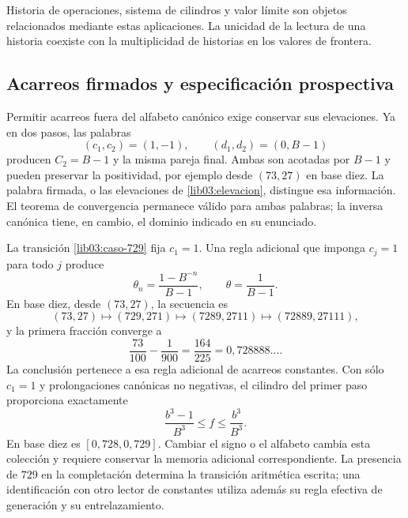 Historia de operaciones, sistema de cilindros y valor límite son
objetos relacionados mediante estas aplicaciones. La unicidad de la
lectura de una historia coexiste con la multiplicidad de historias en
los valores de frontera.

\subsection{Acarreos firmados y especificación prospectiva}
\label{lib03:firmados}

Permitir acarreos fuera del alfabeto canónico exige conservar sus
elevaciones. Ya en dos pasos, las palabras
\[
 (c_1,c_2)=(1,-1),\qquad(d_1,d_2)=(0,B-1)
\]
producen \(C_2=B-1\) y la misma pareja final. Ambas son acotadas por
\(B-1\) y pueden preservar la positividad, por ejemplo desde
\((73,27)\) en base diez. La palabra firmada, o las elevaciones de
\eqref{lib03:elevacion}, distingue esa información. El teorema de
convergencia permanece válido para ambas palabras; la inversa canónica
tiene, en cambio, el dominio indicado en su enunciado.

La transición \eqref{lib03:caso-729} fija \(c_1=1\). Una regla
adicional que imponga \(c_j=1\) para todo \(j\) produce
\begin{equation}
 \theta_n=\frac{1-B^{-n}}{B-1},\qquad
 \theta=\frac1{B-1}.
 \label{lib03:acarreo-constante}
\end{equation}
En base diez, desde \((73,27)\), la secuencia es
\[
 (73,27)\longmapsto(729,271)\longmapsto(7289,2711)
 \longmapsto(72889,27111),
\]
y la primera fracción converge a
\begin{equation}
 \frac{73}{100}-\frac1{900}=\frac{164}{225}
 =0{,}728888\ldots.
 \label{lib03:limite-constante}
\end{equation}
La conclusión pertenece a esa regla adicional de acarreos constantes.
Con sólo \(c_1=1\) y prolongaciones canónicas no negativas, el cilindro
del primer paso proporciona exactamente
\begin{equation}
 \frac{b^3-1}{B^3}\leq f\leq\frac{b^3}{B^3}.
 \label{lib03:primer-cilindro}
\end{equation}
En base diez es \([0{,}728,0{,}729]\). Cambiar el signo o el alfabeto
cambia esta colección y requiere conservar la memoria adicional
correspondiente. La presencia de \(729\) en la completación determina
la transición aritmética escrita; una identificación con otro lector de
constantes utiliza además su regla efectiva de generación y su
entrelazamiento.

